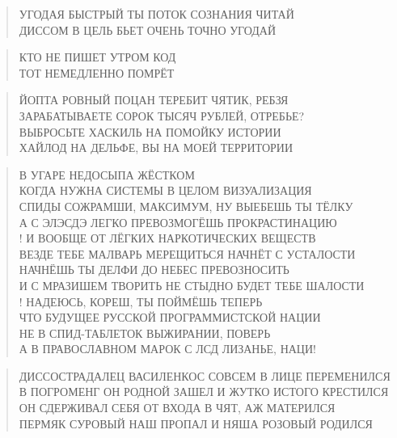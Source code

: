 \poemtitle{***}
\begin{verse}
УГОДАЯ БЫСТРЫЙ ТЫ ПОТОК СОЗНАНИЯ ЧИТАЙ\\
ДИССОМ В ЦЕЛЬ БЬЕТ ОЧЕНЬ ТОЧНО УГОДАЙ
\end{verse}

\poemtitle{***}
\begin{verse}
КТО НЕ ПИШЕТ УТРОМ КОД\\
ТОТ НЕМЕДЛЕННО ПОМРЁТ
\end{verse}

\poemtitle{***}
\begin{verse}
ЙОПТА РОВНЫЙ ПОЦАН ТЕРЕБИТ ЧЯТИК, РЕБЗЯ\\
ЗАРАБАТЫВАЕТЕ СОРОК ТЫСЯЧ РУБЛЕЙ, ОТРЕБЬЕ?\\
ВЫБРОСЬТЕ ХАСКИЛЬ НА ПОМОЙКУ ИСТОРИИ\\
ХАЙЛОД НА ДЕЛЬФЕ, ВЫ НА МОЕЙ ТЕРРИТОРИИ
\end{verse}

\poemtitle{***}
\begin{verse}
В УГАРЕ НЕДОСЫПА ЖЁСТКОМ\\
КОГДА НУЖНА СИСТЕМЫ В ЦЕЛОМ  ВИЗУАЛИЗАЦИЯ\\
СПИДЫ СОЖРАМШИ, МАКСИМУМ, НУ ВЫЕБЕШЬ ТЫ ТЁЛКУ\\
А С ЭЛЭСДЭ ЛЕГКО ПРЕВОЗМОГЁШЬ ПРОКРАСТИНАЦИЮ\\!
И ВООБЩЕ ОТ ЛЁГКИХ НАРКОТИЧЕСКИХ ВЕЩЕСТВ\\
ВЕЗДЕ ТЕБЕ МАЛВАРЬ МЕРЕЩИТЬСЯ НАЧНЁТ С УСТАЛОСТИ\\
НАЧНЁШЬ ТЫ ДЕЛФИ ДО НЕБЕС ПРЕВОЗНОСИТЬ\\
И С МРАЗИШЕМ ТВОРИТЬ НЕ СТЫДНО БУДЕТ ТЕБЕ ШАЛОСТИ\\!
НАДЕЮСЬ, КОРЕШ, ТЫ ПОЙМЁШЬ ТЕПЕРЬ\\
ЧТО БУДУЩЕЕ РУССКОЙ ПРОГРАММИСТСКОЙ НАЦИИ\\
НЕ В СПИД-ТАБЛЕТОК ВЫЖИРАНИИ, ПОВЕРЬ\\
А В ПРАВОСЛАВНОМ МАРОК С ЛСД ЛИЗАНЬЕ, НАЦИ!
\end{verse}

\poemtitle{***}
\begin{verse}
ДИССОСТРАДАЛЕЦ ВАСИЛЕНКОС СОВСЕМ В ЛИЦЕ ПЕРЕМЕНИЛСЯ\\
В ПОГРОМЕНГ ОН РОДНОЙ ЗАШЕЛ И ЖУТКО ИСТОГО КРЕСТИЛСЯ\\
ОН СДЕРЖИВАЛ СЕБЯ ОТ ВХОДА В ЧЯТ, АЖ МАТЕРИЛСЯ\\
ПЕРМЯК СУРОВЫЙ НАШ ПРОПАЛ И НЯША РОЗОВЫЙ РОДИЛСЯ
\end{verse}

